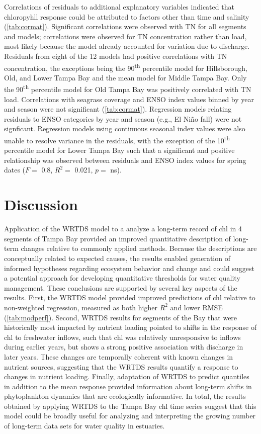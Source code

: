 \documentclass{svjour3}\usepackage[]{graphicx}\usepackage[]{color}
\newcommand{\nine}{90\textsuperscript{th} percentile }
\newcommand{\ten}{10\textsuperscript{th} percentile }
\begin{document}
Correlations of residuals to additional explanatory variables indicated that chloropyhll response could be attributed to factors other than time and salinity (\cref{tab:cormat}). Significant correlations were observed with \ac{TN} for all segments and models; correlations were observed for \ac{TN} concentration rather than load, most likely because the model already accounted for variation due to discharge.  Residuals from eight of the 12 models had positive correlations with \ac{TN} concentration, the exceptions being the \nine model for Hillsborough, Old, and Lower Tampa Bay and the mean model for Middle Tampa Bay.  Only the \nine model for Old Tampa Bay was positively correlated with \ac{TN} load.  Correlations with seagrass coverage and \ac{ENSO} index values binned by year and season were not significant (\cref{tab:cormat}).  Regression models relating residuals to \ac{ENSO} categories by year and season (e.g., El Ni\~{n}o fall) were not signficant.  Regression models using continuous seasonal index values were also unable to resolve variance in the residuals, with the exception of the \ten model for Lower Tampa Bay such that a significant and positive relationship was observed between residuals and \ac{ENSO} index values for spring dates ($F=$ 0.8, $R^2 =$ 0.021, $p=$ ns).  

\section{Discussion}

Application of the \acf{WRTDS} model to a analyze a long-term record of \ac{chl} in 4 segments of Tampa Bay provided an improved quantitative description of long-term changes relative to commonly applied methods.  Because the descriptions are conceptually related to expected causes, the results enabled generation of informed hypotheses regarding ecosystem behavior and change and could suggest a potential approach for developing quantitative thresholds for water quality management.   These conclusions are supported by several key aspects of the results.  First, the \ac{WRTDS} model provided improved predictions of \ac{chl} relative to non-weighted regression, measured as both higher $R^2$ and lower \ac{RMSE} (\cref{tab:modperf}).  Second, \ac{WRTDS} results for segments of the Bay that were historically most impacted by nutrient loading pointed to shifts in the response of \ac{chl} to freshwater inflows, such that \ac{chl} was relatively unresponsive to inflows during earlier years, but shows a strong positive association with discharge in later years.  These changes are temporally coherent with known changes in nutrient sources, suggesting that the \ac{WRTDS} results quantify a response to changes in nutrient loading.  Finally, adaptation of \ac{WRTDS} to predict quantiles in addition to the mean response provided information about long-term shifts in phytoplankton dynamics that are ecologically informative.  In total, the results obtained by applying \ac{WRTDS} to the Tampa Bay \ac{chl} time series suggest that this model could be broadly useful for analyzing and interpreting the growing number of long-term data sets for water quality in estuaries.
\end{document}
